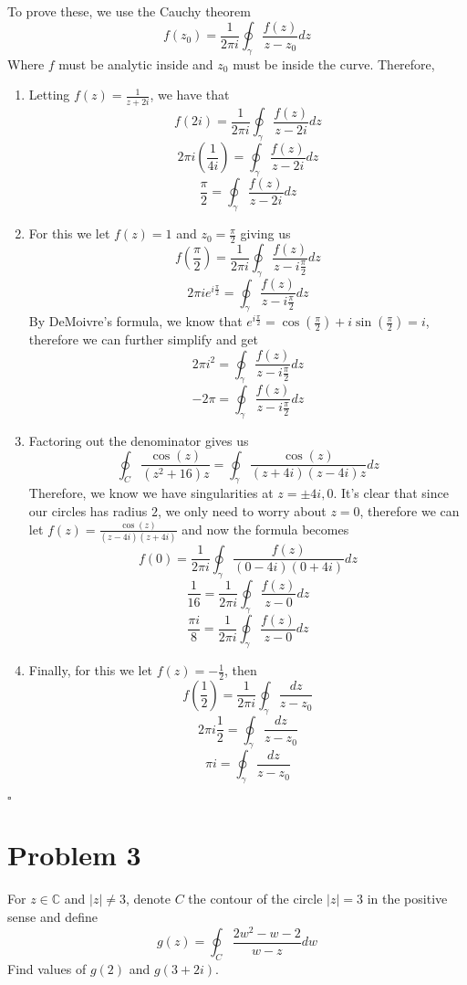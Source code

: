 \documentclass[12pt]{article}
\newcommand{\C}{\mathbb{C}}
\newenvironment{proof}{\noindent{\bf Proof.}}{\hfill $\square$\medskip}
\begin{document}
\begin{proof}
To prove these, we use the Cauchy theorem
$$f(z_{0})=\frac{1}{2\pi i}\oint_{\gamma}\frac{f(z)}{z-z_{0}}dz$$
Where $f$ must be analytic inside and $z_{0}$ must be inside the curve. Therefore,
\begin{enumerate}[label=\textbf{(\alph*)}]
    \item Letting $f(z)=\frac{1}{z+2i}$, we have that
    $$f(2i)=\frac{1}{2\pi i}\oint_{\gamma}\frac{f(z)}{z-2i}dz$$
    $$2\pi i\left(\frac{1}{4i}\right)=\oint_{\gamma}\frac{f(z)}{z-2i}dz$$
    $$\frac{\pi}{2}=\oint_{\gamma}\frac{f(z)}{z-2i}dz$$
    \item For this we let $f(z)=1$ and $z_{0}=\frac{\pi}{2}$ giving us
    $$f(\frac{\pi}{2})=\frac{1}{2\pi i}\oint_{\gamma}\frac{f(z)}{z-i\frac{\pi }{2}}dz$$
    $$2\pi ie^{i\frac{\pi}{2}}=\oint_{\gamma}\frac{f(z)}{z-i\frac{\pi}{2}}dz$$
    By DeMoivre's formula, we know that $e^{i\frac{\pi}{2}}=\cos(\frac{\pi}{2})+i\sin(\frac{\pi}{2})=i$, therefore we can further simplify and get
    $$2\pi i^{2}=\oint_{\gamma}\frac{f(z)}{z-i\frac{\pi}{2}}dz$$
    $$-2\pi=\oint_{\gamma}\frac{f(z)}{z-i\frac{\pi}{2}}dz$$
    \item Factoring out the denominator gives us
    $$\oint_{C}\frac{\cos(z)}{(z^{2}+16)z}=\oint_{\gamma}\frac{\cos(z)}{(z+4i)(z-4i)z}dz$$
    Therefore, we know we have singularities at $z=\pm 4i, 0$. It's clear that since our circles has radius $2$, we only need to worry about $z=0$, therefore we can let $f(z)=\frac{\cos(z)}{(z-4i)(z+4i)}$ and now the formula becomes
    $$f(0)=\frac{1}{2\pi i}\oint_{\gamma}\frac{f(z)}{(0-4i)(0+4i)}dz$$
    $$\frac{1}{16}=\frac{1}{2\pi i}\oint_{\gamma}\frac{f(z)}{z-0}dz$$
    $$\frac{\pi i}{8}=\frac{1}{2\pi i}\oint_{\gamma}\frac{f(z)}{z-0}dz$$
    \item Finally, for this we let $f(z)=-\frac{1}{2}$, then
    $$f(\frac{1}{2})=\frac{1}{2\pi i}\oint_{\gamma}\frac{dz}{z-z_{0}}$$
    $$2\pi i\frac{1}{2}=\oint_{\gamma}\frac{dz}{z-z_{0}}$$
    $$\pi i=\oint_{\gamma}\frac{dz}{z-z_{0}}$$
\end{enumerate}
\end{proof}


\newpage
\section{Problem 3}
For $z\in\C$ and $\left |z\right |\neq 3$, denote $C$ the contour of the circle $\left |z\right |=3$ in the positive sense and define
$$g(z)=\oint_{C}\frac{2w^{2}-w-2}{w-z}dw$$
Find values of $g(2)$ and $g(3+2i)$.
\end{document}
